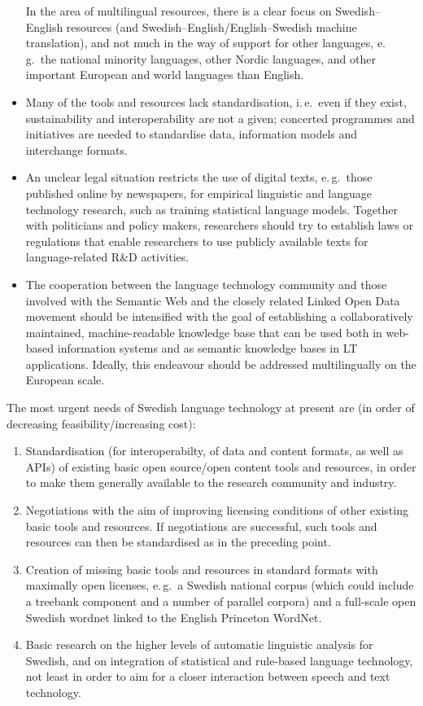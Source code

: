 \begin{multicols}{2}
\begin{itemize}
In the area of multilingual resources, there is a clear focus on
  Swedish--English resources (and Swedish--English/English--Swedish
  machine translation), and not much in the way of support for other
  languages, e.\,g.~the national minority languages, other Nordic
  languages, and other important European and world languages than
  English.
\item Many of the tools and resources lack standardisation, i.\,e.~even
  if they exist, sustainability and interoperability are not a given;
  concerted programmes and initiatives are needed to standardise data,
  information models and interchange formats.
\item An unclear legal situation restricts the use of digital texts,
  e.\,g.~those published online by newspapers, for empirical
  linguistic and language technology research, such as training
  statistical language models. Together with politicians and policy
  makers, researchers should try to establish laws or regulations that
  enable researchers to use publicly available texts for
  language-related R\&D activities.
\item The cooperation between the language technology community and
  those involved with the Semantic Web and the closely related Linked
  Open Data movement should be intensified with the goal of
  establishing a collaboratively maintained, machine-readable
  knowledge base that can be used both in web-based information
  systems and as semantic knowledge bases in LT applications. Ideally,
  this endeavour should be addressed multilingually on the European
  scale.
\end{itemize}

The most urgent needs of Swedish language technology at present are
(in order of decreasing feasibility/increasing cost):
\begin{enumerate}
\item Standardisation (for interoperabilty, of data and content
  formats, as well as APIs) of existing basic open source/open content
  tools and resources, in order to make them generally available to
  the research community and industry.
\item Negotiations with the aim of improving licensing conditions of
  other existing basic tools and resources. If negotiations are
  successful, such tools and resources can then be standardised as in
  the preceding point.
\item Creation of missing basic tools and resources in standard
  formats with maximally open licenses, e.\,g.~a Swedish national
  corpus (which could include a treebank component and a number of
  parallel corpora) \cite{SNK} and a full-scale open Swedish wordnet linked to
  the English Princeton WordNet.
\item Basic research on the higher levels of automatic linguistic
  analysis for Swedish, and on integration of statistical and
  rule-based language technology, not least in order to aim for a
  closer interaction between speech and text technology.
\end{enumerate}



\end{multicols}
